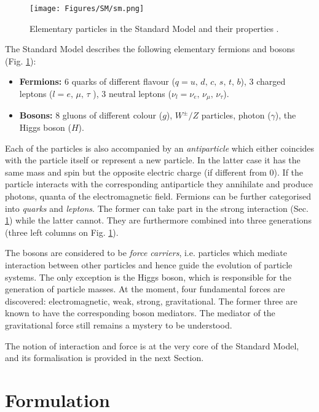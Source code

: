 \begin{figure}[h!]
    \centering
    \texttt{[image: Figures/SM/sm.png]}
    \caption{Elementary particles in the Standard Model and their properties \cite{SM:web-plot}.}
    \label{fig:sm}
\end{figure}

The Standard Model describes the following elementary fermions and bosons (Fig. \ref{fig:sm}):
\begin{itemize}
    \item \textbf{Fermions:} 6 quarks of different flavour ($q = u, \,d, \,c, \,s, \,t, \,b$), 3 charged leptons ($l = e, \,\mu, \,\tau$ ), 3 neutral leptons ($\nu_l= \nu_e, \,\nu_\mu, \,\nu_\tau$).
    \item \textbf{Bosons:} 8 gluons of different colour ($g$), $W^\pm/Z$ particles, photon ($\gamma$), the Higgs boson ($H$). 
\end{itemize}

Each of the particles is also accompanied by an \textit{antiparticle} which either coincides with the particle itself or represent a new particle. In the latter case it has the same mass and spin but the opposite electric charge (if different from 0). If the particle interacts with the corresponding antiparticle they annihilate and produce photons, quanta of the electromagnetic field. Fermions can be further categorised into \textit{quarks} and \textit{leptons}. The former can take part in the strong interaction (Sec. \ref{sec:lagr}) while the latter cannot. They are furthermore combined into three generations (three left columns on Fig. \ref{fig:sm}).

The bosons are considered to be \textit{force carriers}, i.e. particles which mediate interaction between other particles and hence guide the evolution of particle systems. The only exception is the Higgs boson, which is responsible for the generation of particle masses. At the moment, four fundamental forces are discovered: electromagnetic, weak, strong, gravitational. The former three are known to have the corresponding boson mediators. The mediator of the gravitational force still remains a mystery to be understood. 

The notion of interaction and force is at the very core of the Standard Model, and its formalisation is provided in the next Section. 

\section{Formulation}\label{sec:lagr}

